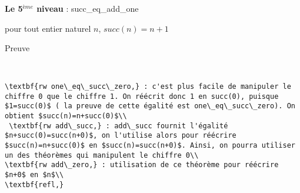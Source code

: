 \textbf{Le 5$^{ème}$ niveau} : succ\_eq\_add\_one \begin{center}  pour tout entier naturel $n$,  $succ(n)=n+1$ \end{center}
Preuve
\begin{verbatim}


\textbf{rw one\_eq\_succ\_zero,} : c'est plus facile de manipuler le chiffre 0 que le chiffre 1. On réécrit donc 1 en succ(0), puisque $1=succ(0)$ ( la preuve de cette égalité est one\_eq\_succ\_zero). On obtient $succ(n)=n+succ(0)$\\
 \textbf{rw add\_succ,} : add\_succ fournit l'égalité $n+succ(0)=succ(n+0)$, on l'utilise alors pour réécrire $succ(n)=n+succ(0)$ en $succ(n)=succ(n+0)$. Ainsi, on pourra utiliser un des théorèmes qui manipulent le chiffre 0\\
\textbf{rw add\_zero,} : utilisation de ce théorème pour réécrire $n+0$ en $n$\\
\textbf{refl,}

\end{verbatim}
